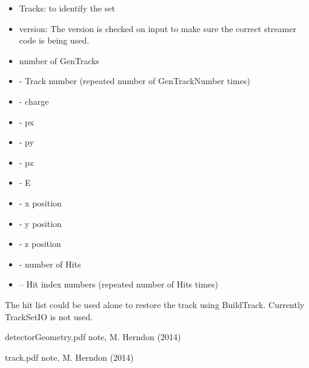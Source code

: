 \documentclass[aps,prd,superscriptaddress,floatfix]{revtex4}
\begin{document}
\begin{itemize}
\item Tracks: to identify the set
\item version: The version is checked on input to make sure the correct streamer code is being used.
\item number of GenTracks
\item - Track number (repeated number of GenTrackNumber times)
\item - charge
\item - px
\item - py
\item - pz
\item - E
\item - x position
\item - y position
\item - z position
\item - number of Hits
\item -- Hit index numbers (repeated number of Hits times)
\end{itemize}

The hit list could be used alone to restore the track using BuildTrack.  Currently TrackSetIO is not used.

\begin{thebibliography}{99}

detectorGeometry.pdf note, M. Herndon (2014)

track.pdf note, M. Herndon (2014)

\end{thebibliography}
% 
\end{document}

